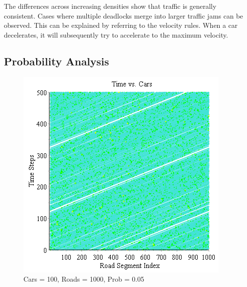 \documentclass[12pt]{extarticle}
\begin{document}
The differences across increasing densities show that traffic is generally consistent. Cases where multiple deadlocks merge into larger traffic jams can be observed. This can be explained by referring to the velocity rules. When a car decelerates, it will subsequently try to accelerate to the maximum velocity. 

\subsection{Probability Analysis}
\begin{figure}[h!]
	\centering
	\includegraphics[scale=0.70]{Graph4.png}
	\caption{Cars = 100, Roads = 1000, Prob = 0.05}
	\label{fig:img4}
\end{figure}
\end{document}
